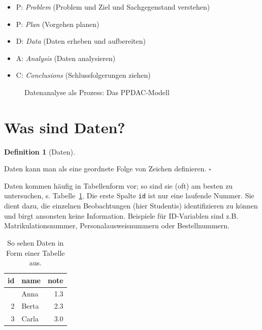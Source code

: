 \documentclass[
  letterpaper,
]{scrbook}
\providecommand{\tightlist}{%
  \setlength{\itemsep}{0pt}\setlength{\parskip}{0pt}}\usepackage{longtable,booktabs,array}
\theoremstyle{definition}
\theoremstyle{definition}
\theoremstyle{definition}
\newtheorem{definition}{Definition}[chapter]
\theoremstyle{remark}
\begin{document}
\begin{itemize}
\tightlist
\item
  P: \emph{Problem} (Problem und Ziel und Sachgegenstand verstehen)
\item
  P: \emph{Plan} (Vorgehen planen)
\item
  D: \emph{Data} (Daten erheben und aufbereiten)
\item
  A: \emph{Analysis} (Daten analysieren)
\item
  C: \emph{Conclusions} (Schlussfolgerungen ziehen)
\end{itemize}

\begin{figure}


\caption{\label{fig-ppdac}Datenanalyse als Prozess: Das PPDAC-Modell}

\end{figure}%

\section{Was sind Daten?}\label{was-sind-daten}

\begin{definition}[Daten]\protect\hypertarget{def-daten}{}\label{def-daten}

Daten kann man als eine geordnete Folge von Zeichen definieren.
\(\square\)

\end{definition}

Daten kommen häufig in Tabellenform vor; so sind sie (oft) am besten zu
untersuchen, s. Tabelle~\ref{tbl-daten}. Die erste Spalte \texttt{id}
ist nur eine laufende Nummer. Sie dient dazu, die einzelnen
Beobachtungen (hier Studentis) identifizieren zu können und birgt
ansonsten keine Information. Beispiele für ID-Variablen sind z.B.
Matrikulationsnummer, Personalausweisnummern oder Bestellnummern.

\begin{longtable}[]{@{}rlr@{}}

\caption{\label{tbl-daten}So sehen Daten in Form einer Tabelle aus.}

\tabularnewline

\toprule\noalign{}
id & name & note \\
\midrule\noalign{}
\endhead
\bottomrule\noalign{}
\endlastfoot
1 & Anna & 1.3 \\
2 & Berta & 2.3 \\
3 & Carla & 3.0 \\

\end{longtable}
\end{document}
